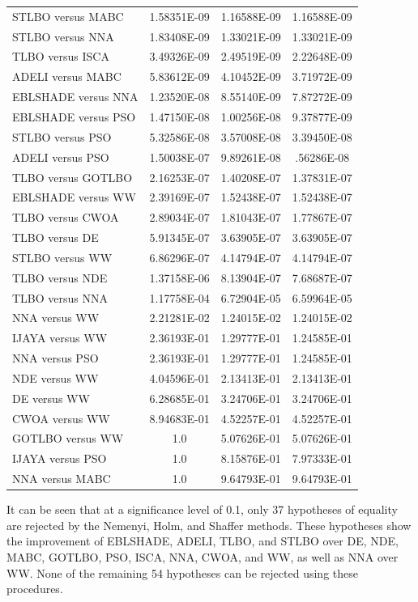 \documentclass[a4paper,fleqn]{cas-sc}
\begin{document}
\begin{table}[<options>]
\begin{tabular*}{\tblwidth}{@{}LCCC@{}}
STLBO versus MABC&1.58351E-09&1.16588E-09&1.16588E-09\\
STLBO versus NNA&1.83408E-09&1.33021E-09&1.33021E-09\\
TLBO versus ISCA&3.49326E-09&2.49519E-09&2.22648E-09\\
ADELI versus MABC&5.83612E-09&4.10452E-09&3.71972E-09\\
EBLSHADE versus NNA&1.23520E-08&8.55140E-09&7.87272E-09\\
EBLSHADE versus PSO&1.47150E-08&1.00256E-08&9.37877E-09\\
STLBO versus PSO&5.32586E-08&3.57008E-08&3.39450E-08\\
ADELI versus PSO&1.50038E-07&9.89261E-08&.56286E-08\\
TLBO versus GOTLBO&2.16253E-07&1.40208E-07&1.37831E-07\\
EBLSHADE versus WW&2.39169E-07&1.52438E-07&1.52438E-07\\
TLBO versus CWOA&2.89034E-07&1.81043E-07&1.77867E-07\\
TLBO versus DE&5.91345E-07&3.63905E-07&3.63905E-07\\
STLBO versus WW&6.86296E-07&4.14794E-07&4.14794E-07\\
TLBO versus NDE&1.37158E-06&8.13904E-07&7.68687E-07\\
TLBO versus NNA&1.17758E-04&6.72904E-05&6.59964E-05\\
NNA versus WW&2.21281E-02&1.24015E-02&1.24015E-02\\
IJAYA versus WW&2.36193E-01&1.29777E-01&1.24585E-01\\
NNA versus PSO&2.36193E-01&1.29777E-01&1.24585E-01\\
NDE versus WW&4.04596E-01&2.13413E-01&2.13413E-01\\
DE versus WW&6.28685E-01&3.24706E-01&3.24706E-01\\
CWOA versus WW&8.94683E-01&4.52257E-01&4.52257E-01\\
GOTLBO versus WW&1.0&5.07626E-01&5.07626E-01\\
IJAYA versus PSO&1.0&8.15876E-01&7.97333E-01\\
NNA versus MABC&1.0&9.64793E-01&9.64793E-01\\
\bottomrule
\end{tabular*}
\end{table}



It can be seen that at a significance level of 0.1,
only 37 hypotheses of equality are rejected by the Nemenyi, Holm, and Shaffer methods.
These hypotheses show the improvement of EBLSHADE, ADELI, TLBO, and STLBO
over DE, NDE, MABC, GOTLBO, PSO, ISCA, NNA, CWOA, and WW,
as well as NNA over WW.
None of the remaining 54 hypotheses can be rejected using these procedures.
\end{document}
